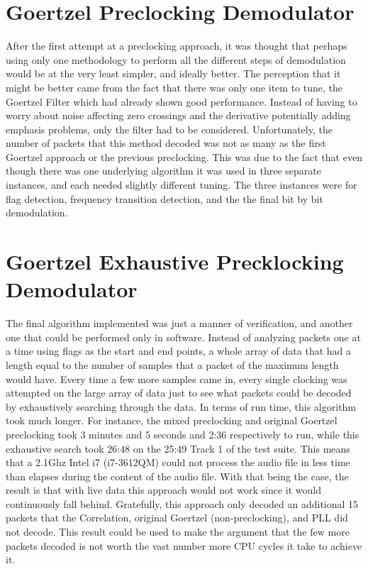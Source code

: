 \section{Goertzel Preclocking Demodulator}
After the first attempt at a preclocking approach, it was thought that perhaps using only one methodology to perform all the different steps of demodulation would be at the very least simpler, and ideally better. The perception that it might be better came from the fact that there was only one item to tune, the Goertzel Filter which had already shown good performance. Instead of having to worry about noise affecting zero crossings and the derivative potentially adding emphasis problems, only the filter had to be considered. Unfortunately, the number of packets that this method decoded was not as many as the first Goertzel approach or the previous preclocking. This was due to the fact that even though there was one underlying algorithm it was used in three separate instances, and each needed slightly different tuning. The three instances were for flag detection, frequency transition detection, and the the final bit by bit demodulation.

\section{Goertzel Exhaustive Precklocking Demodulator}
The final algorithm implemented was just a manner of verification, and another one that could be performed only in software. Instead of analyzing packets one at a time using flags as the start and end points, a whole array of data that had a length equal to the number of samples that a packet of the maximum length would have. Every time a few more samples came in, every single clocking was attempted on the large array of data just to see what packets could be decoded by exhaustively searching through the data. In terms of run time, this algorithm took much longer. For instance, the mixed preclocking and original Goertzel preclocking took 3 minutes and 5 seconds and 2:36 respectively to run, while this exhaustive search took 26:48 on the 25:49 Track 1 of the test suite. This means that a 2.1Ghz Intel i7 (i7-3612QM) could not process the audio file in less time than elapses during the content of the audio file. With that being the case, the result is that with live data this approach would not work since it would continuously fall behind. Gratefully, this approach only decoded an additional 15 packets that the Correlation, original Goertzel (non-preclocking), and PLL did not decode. This result could be used to make the argument that the few more packets decoded is not worth the vast number more CPU cycles it take to achieve it.

